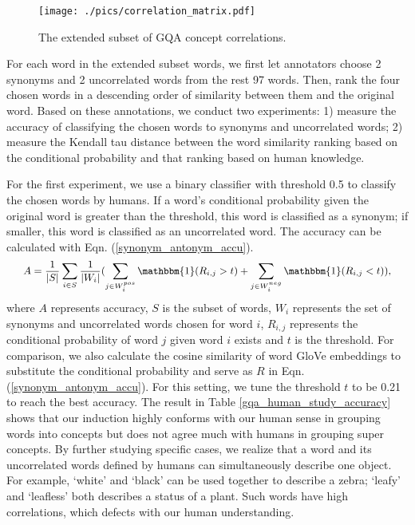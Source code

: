\documentclass[10pt,twocolumn,letterpaper]{article}
\begin{document}
\begin{figure*}
\centering
\texttt{[image: ./pics/correlation\_matrix.pdf]}
\caption{The extended subset of GQA concept correlations.}
\label{extended_GQA_subset}
\end{figure*}

For each word in the extended subset words, we first let annotators choose 2 synonyms and 2 uncorrelated words from the rest 97 words. Then, rank the four chosen words in a descending order of similarity between them and the original word. Based on these annotations, we conduct two experiments: 1) measure the accuracy of classifying the chosen words to synonyms and uncorrelated words; 2) measure the Kendall tau distance \cite{kendall1938new} between the word similarity ranking based on the conditional probability and that ranking based on human knowledge. 

For the first experiment, we use a binary classifier with threshold 0.5 to classify the chosen words by humans. If a word's conditional probability given the original word is greater than the threshold, this word is classified as a synonym; if smaller, this word is classified as an uncorrelated word. The accuracy can be calculated with Eqn. (\ref{synonym_antonym_accu}).
\begin{equation}
\small
\begin{split}
    A = \frac{1}{|S|}\sum_{i \in S} \frac{1}{|W_i|}(\sum_{j \in W_i^{pos}} \mathbbm{1}(R_{i,j}>t) + \sum_{j \in W_i^{neg}} \mathbbm{1}(R_{i,j}<t)),
    \label{synonym_antonym_accu}
\end{split}
\end{equation}
where $A$ represents accuracy, $S$ is the subset of words, $W_i$ represents the set of synonyms and uncorrelated words chosen for word $i$, $R_{i,j}$ represents the conditional probability of word $j$ given word $i$ exists and $t$ is the threshold. For comparison, we also calculate the cosine similarity of word GloVe \cite{pennington2014glove} embeddings to substitute the conditional probability and serve as $R$ in Eqn. (\ref{synonym_antonym_accu}). For this setting, we tune the threshold $t$ to be 0.21 to reach the best accuracy. The result in Table \ref{gqa_human_study_accuracy} shows that our induction highly conforms with our human sense in grouping words into concepts but does not agree much with humans in grouping super concepts. By further studying specific cases, we realize that a word and its uncorrelated words defined by humans can simultaneously describe one object. For example, `white' and `black' can be used together to describe a zebra; `leafy' and `leafless' both describes a status of a plant. Such words have high correlations, which defects with our human understanding.
\end{document}
